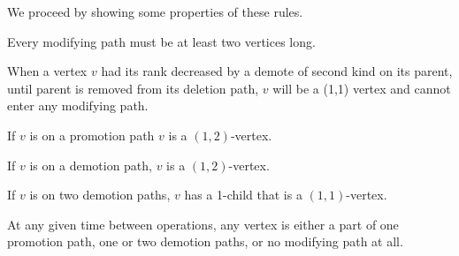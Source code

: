 We proceed by showing some properties of these rules.

\begin{obs}
Every modifying path must be at least two vertices long.
\end{obs}

\begin{obs}
When a vertex $v$ had its rank decreased by a demote of second kind on its parent, until parent is removed from its deletion path, $v$ will be a (1,1) vertex and cannot enter any modifying path. 
\end{obs}

\begin{obs}
If $v$ is on a promotion path $v$ is a $(1,2)$-vertex.
\end{obs}

\begin{obs}
If $v$ is on a demotion path, $v$ is a $(1,2)$-vertex.
\end{obs}

\begin{obs}
If $v$ is on two demotion paths, $v$ has a 1-child that is a $(1,1)$-vertex.
\end{obs}

\begin{prop}
At any given time between operations, any vertex is either a part of one promotion path, one or two demotion paths, or no modifying path at all.
\label{thm-constant-paths}
\end{prop}

